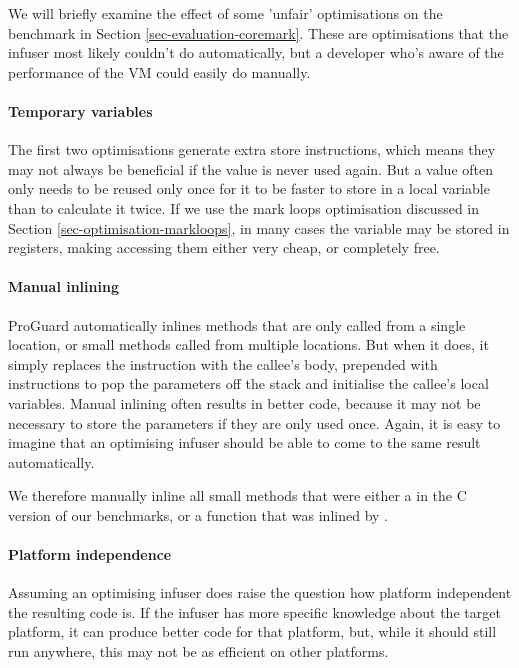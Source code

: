 We will briefly examine the effect of some 'unfair' optimisations on the  benchmark in Section \ref{sec-evaluation-coremark}. These are optimisations that the infuser most likely couldn't do automatically, but a developer who's aware of the performance of the VM could easily do manually.

\paragraph{Temporary variables}
The first two optimisations generate extra store instructions, which means they may not always be beneficial if the value is never used again. But a value often only needs to be reused only once for it to be faster to store in a local variable than to calculate it twice. If we use the mark loops optimisation discussed in Section \ref{sec-optimisation-markloops}, in many cases the variable may be stored in registers, making accessing them either very cheap, or completely free.

\paragraph{Manual inlining}
ProGuard automatically inlines methods that are only called from a single location, or small methods called from multiple locations. But when it does, it simply replaces the  instruction with the callee's body, prepended with  instructions to pop the parameters off the stack and initialise the callee's local variables. Manual inlining often results in better code, because it may not be necessary to store the parameters if they are only used once. Again, it is easy to imagine that an optimising infuser should be able to come to the same result automatically.

We therefore manually inline all small methods that were either a  in the C version of our benchmarks, or a function that was inlined by .



\paragraph{Platform independence}
Assuming an optimising infuser does raise the question how platform independent the resulting code is. If the infuser has more specific knowledge about the target platform, it can produce better code for that platform, but, while it should still run anywhere, this may not be as efficient on other platforms.

